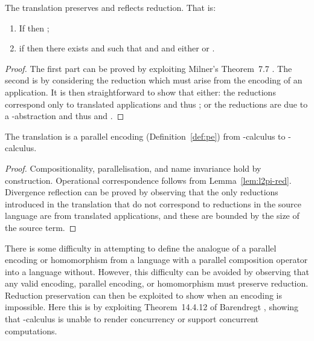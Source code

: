 \documentclass{llncs}
\begin{document}
\begin{lemma}
\label{lem:l2pi-red}
The translation  preserves and reflects reduction.
That is:
\begin{enumerate}
\item If  then ;
\item if  then there exists  and  such that
       and  and either  or .
\end{enumerate}
\end{lemma}
\begin{proof}
The first part can be proved by exploiting Milner's Theorem~7.7 \cite{90426}.
The second is by considering the reduction  which must arise
from the encoding of an application. It is then straightforward to show that either:
the reductions  correspond only to translated applications and thus
; or
the reductions are due to a -abstraction and thus
 and .
\end{proof}

\begin{theorem}
\label{thm:lambda2pi}
The translation  is a parallel encoding (Definition~\ref{def:pe}) from -calculus to -calculus.
\end{theorem}
\begin{proof}
Compositionality, parallelisation, and name invariance hold by construction.
Operational correspondence follows from Lemma~\ref{lem:l2pi-red}.
Divergence reflection can be proved by observing that the only reductions introduced
in the translation that do not correspond to reductions in the source language are
from translated applications, and these are bounded by the size of the source term.
\end{proof}


There is some difficulty in attempting to define the analogue of a parallel encoding or
homomorphism from a language with a parallel composition operator into a language without.
However, this difficulty can be avoided by observing that any valid encoding, parallel
encoding, or homomorphism must preserve reduction.
Reduction preservation can then be exploited to show when an encoding is impossible.
Here this is by exploiting Theorem~14.4.12 of Barendregt \cite{Barendregt85}, showing that
-calculus is unable to render concurrency or support concurrent computations.
\end{document}

